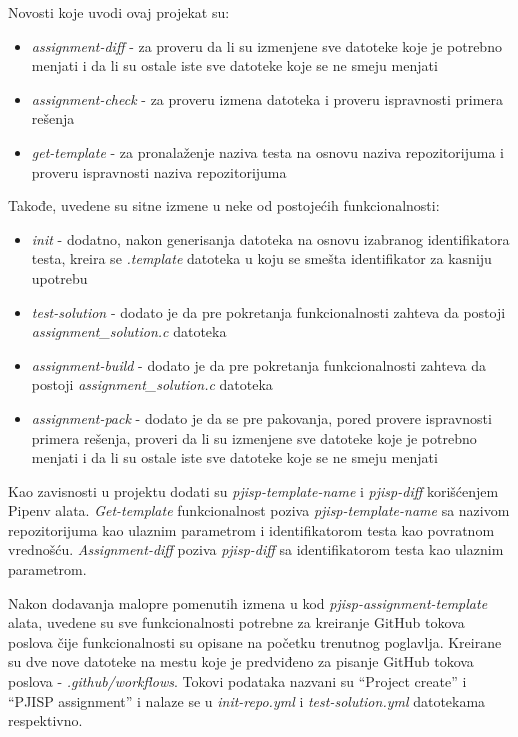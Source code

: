 \documentclass[12pt]{report}
\begin{document}
Novosti koje uvodi ovaj projekat su:

\begin{itemize}
    \item \textit{assignment-diff} - za proveru da li su izmenjene sve datoteke koje je potrebno menjati i da li su ostale iste sve datoteke koje se ne smeju menjati
    \item \textit{assignment-check} - za proveru izmena datoteka i proveru ispravnosti primera rešenja
    \item \textit{get-template} - za pronalaženje naziva testa na osnovu naziva repozitorijuma i proveru ispravnosti naziva repozitorijuma
\end{itemize}

Takođe, uvedene su sitne izmene u neke od postojećih funkcionalnosti:

\begin{itemize}
    \item \textit{init} - dodatno, nakon generisanja datoteka na osnovu izabranog identifikatora testa, kreira se \textit{.template} datoteka u koju se smešta identifikator za kasniju upotrebu
    \item \textit{test-solution} - dodato je da pre pokretanja funkcionalnosti zahteva da postoji \textit{assignment\_solution.c} datoteka
    \item \textit{assignment-build} - dodato je da pre pokretanja funkcionalnosti zahteva da postoji \textit{assignment\_solution.c} datoteka
    \item \textit{assignment-pack} - dodato je da se pre pakovanja, pored provere ispravnosti primera rešenja, proveri da li su izmenjene sve datoteke koje je potrebno menjati i da li su ostale iste sve datoteke koje se ne smeju menjati
\end{itemize}

Kao zavisnosti u projektu dodati su \textit{pjisp-template-name} i \textit{pjisp-diff} korišćenjem Pipenv alata. \textit{Get-template} funkcionalnost poziva \textit{pjisp-template-name} sa nazivom repozitorijuma kao ulaznim parametrom i identifikatorom testa kao povratnom vrednošću. \textit{Assignment-diff} poziva \textit{pjisp-diff} sa identifikatorom testa kao ulaznim parametrom.

Nakon dodavanja malopre pomenutih izmena u kod \textit{pjisp-assignment-template} alata, uvedene su sve funkcionalnosti potrebne za kreiranje GitHub tokova poslova čije funkcionalnosti su opisane na početku trenutnog poglavlja. Kreirane su dve nove datoteke na mestu koje je predviđeno za pisanje GitHub tokova poslova - \textit{.github/workflows}. Tokovi podataka nazvani su ``Project create'' i ``PJISP assignment'' i nalaze se u \textit{init-repo.yml} i \textit{test-solution.yml} datotekama respektivno.
\end{document}
